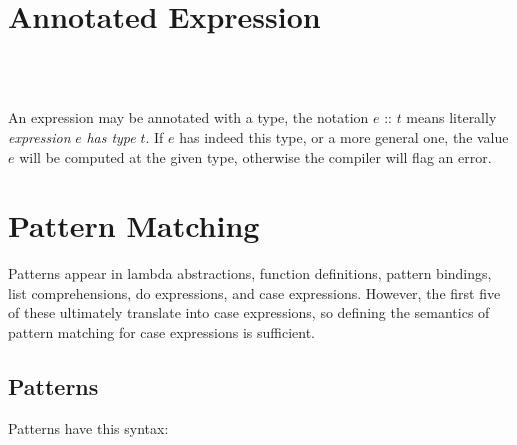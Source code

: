 \section{Annotated Expression} \label{annex}

\begin{flushleft}
  \sym{::}  \alt{} \\
  \alt{}  \alt{}  \alt{}  \alt{}  \\
\end{flushleft}

An expression may be annotated with a type, the notation $e$ :: $t$ means literally \emph{expression} $e$ \emph{has type} $t$. If $e$ has indeed this type, or a more general one, the value $e$ will be computed at the given type, otherwise the compiler will flag an error.



\section{Pattern Matching} \label{patternmatch}

Patterns appear in lambda abstractions, function definitions, pattern bindings, list comprehensions, do expressions, and case expressions. However, the first five of these ultimately translate into case expressions, so defining the semantics of pattern matching for case expressions is sufficient.

\subsection{Patterns} \label{patterns}

Patterns have this syntax:

